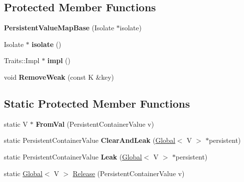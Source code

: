\subsection*{Protected Member Functions}
\begin{DoxyCompactItemize}
\item 
\mbox{\label{classv8_1_1PersistentValueMapBase_a1adee3f8b1ff929f07ddf9e94c6108ed}} 
{\bfseries Persistent\+Value\+Map\+Base} (Isolate $\ast$isolate)
\item 
\mbox{\label{classv8_1_1PersistentValueMapBase_af2e83791955c6027213dd979eebeb8f4}} 
Isolate $\ast$ {\bfseries isolate} ()
\item 
\mbox{\label{classv8_1_1PersistentValueMapBase_aacd576258fbffaf366436a6ecdd8cdf5}} 
Traits\+::\+Impl $\ast$ {\bfseries impl} ()
\item 
\mbox{\label{classv8_1_1PersistentValueMapBase_a5c16ace49c257f760c92a010a93b4884}} 
void {\bfseries Remove\+Weak} (const K \&key)
\end{DoxyCompactItemize}
\subsection*{Static Protected Member Functions}
\begin{DoxyCompactItemize}
\item 
\mbox{\label{classv8_1_1PersistentValueMapBase_af8fcd471f2d53ffca9881f7c436044e8}} 
static V $\ast$ {\bfseries From\+Val} (Persistent\+Container\+Value v)
\item 
\mbox{\label{classv8_1_1PersistentValueMapBase_a7b083c75829bbc4177729ffe9827c4ac}} 
static Persistent\+Container\+Value {\bfseries Clear\+And\+Leak} (\mbox{\hyperlink{classv8_1_1Global}{Global}}$<$ V $>$ $\ast$persistent)
\item 
\mbox{\label{classv8_1_1PersistentValueMapBase_adacf68ca7b9fb19deab68711a70a8313}} 
static Persistent\+Container\+Value {\bfseries Leak} (\mbox{\hyperlink{classv8_1_1Global}{Global}}$<$ V $>$ $\ast$persistent)
\item 
static \mbox{\hyperlink{classv8_1_1Global}{Global}}$<$ V $>$ \mbox{\hyperlink{classv8_1_1PersistentValueMapBase_a9ffa7a4e0c59121c0471d71c04112966}{Release}} (Persistent\+Container\+Value v)
\end{DoxyCompactItemize}


